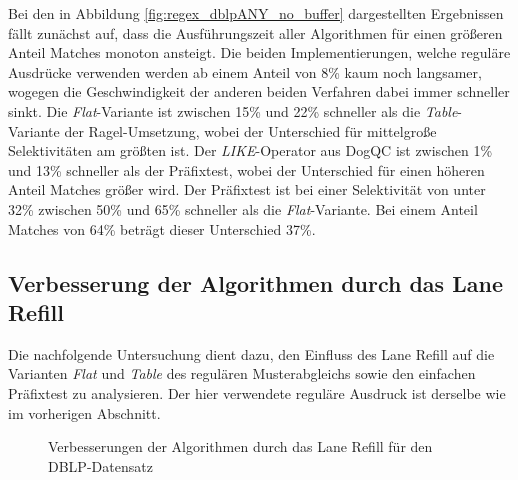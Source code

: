 Bei den in Abbildung \ref{fig:regex_dblpANY_no_buffer} dargestellten Ergebnissen fällt zunächst auf, dass die Ausführungszeit aller Algorithmen für einen größeren Anteil Matches monoton ansteigt.
Die beiden Implementierungen, welche reguläre Ausdrücke verwenden werden ab einem Anteil von 8\% kaum noch langsamer, wogegen die Geschwindigkeit der anderen beiden Verfahren dabei immer schneller sinkt.
Die \emph{Flat}-Variante ist zwischen 15\% und 22\% schneller als die \emph{Table}-Variante der Ragel-Umsetzung, wobei der Unterschied für mittelgroße Selektivitäten am größten ist.
Der \emph{LIKE}-Operator aus DogQC ist zwischen 1\% und 13\% schneller als der Präfixtest, wobei der Unterschied für einen höheren Anteil Matches größer wird.
Der Präfixtest ist bei einer Selektivität von unter 32\% zwischen 50\% und 65\% schneller als die \emph{Flat}-Variante.
Bei einem Anteil Matches von 64\% beträgt dieser Unterschied 37\%.

\subsection{Verbesserung der Algorithmen durch das Lane Refill}
\label{sec:regex_evaluation_beobachtung_2}

Die nachfolgende Untersuchung dient dazu, den Einfluss des Lane Refill auf die Varianten \emph{Flat} und \emph{Table} des regulären Musterabgleichs sowie den einfachen Präfixtest zu analysieren.
Der hier verwendete reguläre Ausdruck ist derselbe wie im vorherigen Abschnitt.

\begin{figure}[ht]
	\centering
	\caption{Verbesserungen der Algorithmen durch das Lane Refill für den DBLP-Datensatz}
	\label{fig:regex_dblpANY_buffer}
\end{figure}

